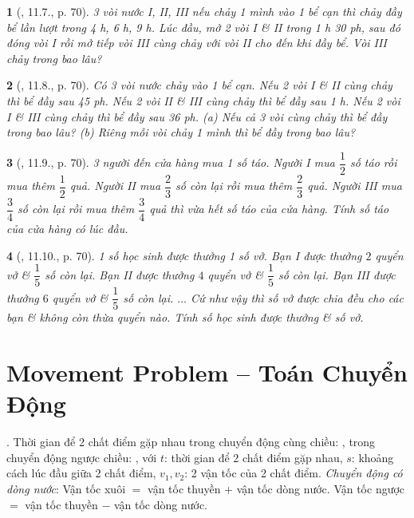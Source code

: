 \documentclass{article}
\newtheorem{baitoan}{}
\begin{document}
\begin{baitoan}[\cite{TLCT_THCS_Toan_6_so_hoc}, 11.7., p. 70]
	3 vòi nước I, II, III nếu chảy 1 mình vào 1 bể cạn thì chảy đầy bể lần lượt trong {\rm4 h, 6 h, 9 h}. Lúc đầu, mở 2 vòi I \& II trong {\rm1 h 30 ph}, sau đó đóng vòi I rồi mở tiếp vòi III cùng chảy với vòi II cho đến khi đầy bể. Vòi III chảy trong bao lâu?
\end{baitoan}

\begin{baitoan}[\cite{TLCT_THCS_Toan_6_so_hoc}, 11.8., p. 70]
	Có 3 vòi nước chảy vào 1 bể cạn. Nếu 2 vòi I \& II cùng chảy thì bể đầy sau {\rm45 ph}. Nếu 2 vòi II \& III cùng chảy thì bể đầy sau {\rm1 h}. Nếu 2 vòi I \& III cùng chảy thì bể đầy sau {\rm36 ph}. (a) Nếu cả 3 vòi cùng chảy thì bể đầy trong bao lâu? (b) Riêng mỗi vòi chảy 1 mình thì bể đầy trong bao lâu?
\end{baitoan}

\begin{baitoan}[\cite{TLCT_THCS_Toan_6_so_hoc}, 11.9., p. 70]
	3 người đến cửa hàng mua 1 số táo. Người I mua $\dfrac{1}{2}$ số táo rồi mua thêm $\dfrac{1}{2}$ quả. Người II mua $\dfrac{2}{3}$ số còn lại rồi mua thêm $\dfrac{2}{3}$ quả. Người III mua $\dfrac{3}{4}$ số còn lại rồi mua thêm $\dfrac{3}{4}$ quả thì vừa hết số táo của cửa hàng. Tính số táo của cửa hàng có lúc đầu.
\end{baitoan}

\begin{baitoan}[\cite{TLCT_THCS_Toan_6_so_hoc}, 11.10., p. 70]
	1 số học sinh được thưởng 1 số vở. Bạn I được thưởng $2$ quyển vở \& $\dfrac{1}{5}$ số còn lại. Bạn II được thưởng $4$ quyển vở \& $\dfrac{1}{5}$ số còn lại. Bạn III được thưởng $6$ quyển vở \& $\dfrac{1}{5}$ số còn lại. $\ldots$ Cứ như vậy thì số vở được chia đều cho các bạn \& không còn thừa quyển nào. Tính số học sinh được thưởng \& số vở.
\end{baitoan}


\section{Movement Problem -- Toán Chuyển Động}
 .  Thời gian để 2 chất điểm gặp nhau trong chuyển động cùng chiều: , trong chuyển động ngược chiều: , với $t$: thời gian để 2 chất điểm gặp nhau, $s$: khoảng cách lúc đầu giữa 2 chất điểm, $v_1,v_2$: 2 vận tốc của 2 chất điểm.  \textit{Chuyển động có dòng nước}: Vận tốc xuôi $=$ vận tốc thuyền $+$ vận tốc dòng nước. Vận tốc ngược $=$ vận tốc thuyền $-$ vận tốc dòng nước.
\end{document}
